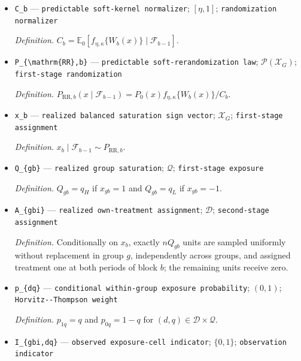 \documentclass{article}
\begin{document}
\begin{itemize}
  \item \texttt{C\_\allowbreak{}b} --- \texttt{predictable soft-\allowbreak{}kernel normalizer}; \([\eta,1]\); \texttt{randomization normalizer}
  \par\smallskip\noindent\emph{Definition.} \(C_b=\mathbb E_0[f_{\eta,\kappa}\{W_b(x)\}\mid\mathcal F_{b-1}]\).
  \item \texttt{P\_\allowbreak{}\{\textbackslash{}\allowbreak{}mathrm\{RR\}\allowbreak{},\allowbreak{}b\}\allowbreak{}} --- \texttt{predictable soft-\allowbreak{}rerandomization law}; \(\mathcal P(\mathcal X_G)\); \texttt{first-\allowbreak{}stage randomization}
  \par\smallskip\noindent\emph{Definition.} \(P_{\mathrm{RR},b}(x\mid\mathcal F_{b-1})=P_0(x)f_{\eta,\kappa}\{W_b(x)\}/C_b\).
  \item \texttt{x\_\allowbreak{}b} --- \texttt{realized balanced saturation sign vector}; \(\mathcal X_G\); \texttt{first-\allowbreak{}stage assignment}
  \par\smallskip\noindent\emph{Definition.} \(x_b\mid\mathcal F_{b-1}\sim P_{\mathrm{RR},b}\).
  \item \texttt{Q\_\allowbreak{}\{gb\}\allowbreak{}} --- \texttt{realized group saturation}; \(\mathcal Q\); \texttt{first-\allowbreak{}stage exposure}
  \par\smallskip\noindent\emph{Definition.} \(Q_{gb}=q_H\) if \(x_{gb}=1\) and \(Q_{gb}=q_L\) if \(x_{gb}=-1\).
  \item \texttt{A\_\allowbreak{}\{gbi\}\allowbreak{}} --- \texttt{realized own-\allowbreak{}treatment assignment}; \(\mathcal D\); \texttt{second-\allowbreak{}stage assignment}
  \par\smallskip\noindent\emph{Definition.} Conditionally on \(x_b\), exactly \(nQ_{gb}\) units are sampled uniformly without replacement in group \(g\), independently across groups, and assigned treatment one at both periods of block \(b\); the remaining units receive zero.
  \item \texttt{p\_\allowbreak{}\{dq\}\allowbreak{}} --- \texttt{conditional within-\allowbreak{}group exposure probability}; \((0,1)\); \texttt{Horvitz-\allowbreak{}-\allowbreak{}Thompson weight}
  \par\smallskip\noindent\emph{Definition.} \(p_{1q}=q\) and \(p_{0q}=1-q\) for \((d,q)\in\mathcal D\times\mathcal Q\).
  \item \texttt{I\_\allowbreak{}\{gbi,\allowbreak{}dq\}\allowbreak{}} --- \texttt{observed exposure-\allowbreak{}cell indicator}; \(\{0,1\}\); \texttt{observation indicator}

\end{itemize}
\end{document}
